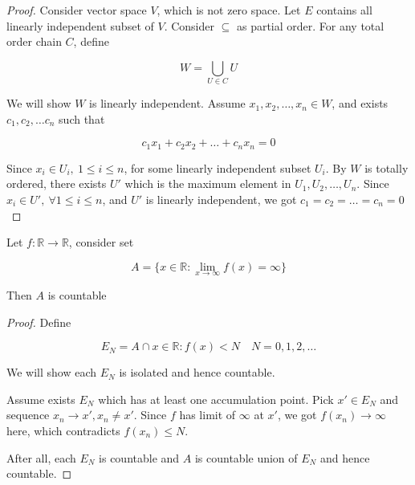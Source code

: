\begin{proof}
   Consider vector space $V$, which is not zero space. Let $E$ contains  
   all linearly independent subset of $V$. Consider $\subseteq$ as partial order.
   For any total order chain $C$, define 

   \[
        W = \bigcup_{U \in C} U
   \]

   We will show $W$ is linearly independent. Assume $x_1, x_2, \dots, x_n \in W$, and exists $c_1,c_2,\dots c_n$ such that

   \[
    c_1x_1 + c_2 x_2 + \dots + c_n x_n = 0
   \]

    Since $x_i \in U_i,\: 1 \le i \le n$, for some linearly independent subset $U_i$. 
    By $W$ is totally ordered, there exists $U'$ which is the 
    maximum element in $U_1,U_2,\dots ,U_n$. Since $x_i \in U', \: \forall 1 \le i \le n$, 
    and $U'$ is linearly independent, we got $c_1 = c_2 = \dots = c_n = 0$

\end{proof}

\begin{exercise}
    Let $f: \mathbb{R} \to \mathbb{R}$, consider set

    \[
        A = \{x \in \mathbb{R}: \lim_{x \to \infty} f(x) = \infty \}
    \]

    Then $A$ is countable
\end{exercise}

\begin{proof}
    Define

    \[
        E_N = A \cap {x \in \mathbb{R}: f(x) < N} \quad N = 0,1,2, \dots
    \]

    We will show each $E_N$ is isolated and hence countable.

    Assume exists $E_N$ which has at least one accumulation point. Pick $x' \in E_N$ and sequence $x_n \to x', x_n \ne x'$.
    Since $f$ has limit of $\infty$ at $x'$, we got $f(x_n) \to \infty$ here, which   
    contradicts $f(x_n) \le N$.

    After all, each $E_N$ is countable and $A$ is countable union of $E_N$ and hence countable.

\end{proof}